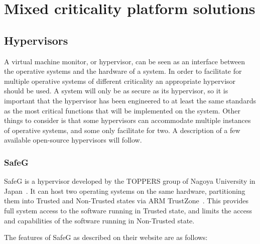 \section{Mixed criticality platform solutions}

\subsection{Hypervisors}
A virtual machine monitor, or hypervisor, can be seen as an interface between the operative systems and the hardware of a system. In order to facilitate for multiple operative systems of different criticality an appropriate hypervisor should be used. A system will only be as secure as its hypervisor, so it is important that the hypervisor has been engineered to at least the same standards as the most critical functions that will be implemented on the system. Other things to consider is that some hypervisors can accommodate multiple instances of operative systems, and some only facilitate for two. A description of a few available open-source hypervisors will follow.

\subsubsection{SafeG}
SafeG is a hypervisor developed by the TOPPERS group of Nagoya University in Japan~\cite{website:safeg}. It can host two operating systems on the same hardware, partitioning them into Trusted and Non-Trusted states via ARM TrustZone~\cite{website:ARM}. This provides full system access to the software running in Trusted state, and limits the access and capabilities of the software running in Non-Trusted state.

The features of SafeG as described on their website are as follows:

